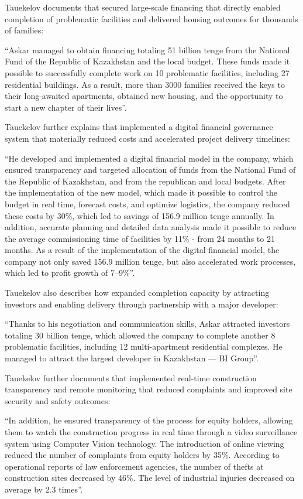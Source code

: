 Tauekelov documents that \mrl{} secured large-scale financing that directly enabled completion of problematic facilities and delivered housing outcomes for thousands of families:
\begin{fullquote}
``Askar managed to obtain financing totaling 51 billion tenge from the National Fund of the Republic of Kazakhstan and the local budget. These funds made it possible to successfully complete work on 10 problematic facilities, including 27 residential buildings. As a result, more than 3000 families received the keys to their long-awaited apartments, obtained new housing, and the opportunity to start a new chapter of their lives''.
\end{fullquote}

Tauekelov further explains that \mrl{} implemented a digital financial governance system that materially reduced costs and accelerated project delivery timelines:
\begin{fullquote}
``He developed and implemented a digital financial model in the company, which ensured transparency and targeted allocation of funds from the National Fund of the Republic of Kazakhstan, and from the republican and local budgets. After the implementation of the new model, which made it possible to control the budget in real time, forecast costs, and optimize logistics, the company reduced these costs by 30\%, which led to savings of 156.9 million tenge annually. In addition, accurate planning and detailed data analysis made it possible to reduce the average commissioning time of facilities by 11\% - from 24 months to 21 months. As a result of the implementation of the digital financial model, the company not only saved 156.9 million tenge, but also accelerated work processes, which led to profit growth of 7–9\%''.
\end{fullquote}

Tauekelov also describes how \mrl{} expanded completion capacity by attracting investors and enabling delivery through partnership with a major developer:
\begin{fullquote}
``Thanks to his negotiation and communication skills, Askar attracted investors totaling 30 billion tenge, which allowed the company to complete another 8 problematic facilities, including 12 multi-apartment residential complexes. He managed to attract the largest developer in Kazakhstan — BI Group''.
\end{fullquote}

Tauekelov further documents that \mrl{} implemented real-time construction transparency and remote monitoring that reduced complaints and improved site security and safety outcomes:
\begin{fullquote}
``In addition, he ensured transparency of the process for equity holders, allowing them to watch the construction progress in real time through a video surveillance system using Computer Vision technology. The introduction of online viewing reduced the number of complaints from equity holders by 35\%. According to operational reports of law enforcement agencies, the number of thefts at construction sites decreased by 46\%. The level of industrial injuries decreased on average by 2.3 times''.
\end{fullquote}


